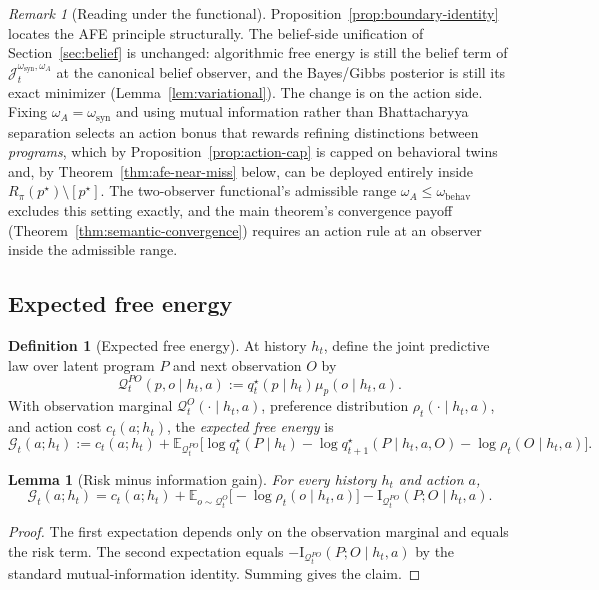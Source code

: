 \documentclass[11pt]{article}
\newtheorem{lemma}[theorem]{Lemma}
\theoremstyle{definition}
\newtheorem{definition}[theorem]{Definition}
\theoremstyle{remark}
\newtheorem{remark}[theorem]{Remark}
\newcommand{\Gcal}{\mathcal{G}}
\newcommand{\Qcal}{\mathcal{Q}}
\newcommand{\E}{\mathbb{E}}
\newcommand{\I}{\mathrm{I}}
\begin{document}
\begin{remark}[Reading under the functional]
\label{rem:boundary-identity}
Proposition~\ref{prop:boundary-identity} locates the AFE principle structurally. The belief-side unification of Section~\ref{sec:belief} is unchanged: algorithmic free energy is still the belief term of $\mathcal J_t^{\omega_{\mathrm{syn}},\omega_A}$ at the canonical belief observer, and the Bayes/Gibbs posterior is still its exact minimizer (Lemma~\ref{lem:variational}). The change is on the action side. Fixing $\omega_A=\omega_{\mathrm{syn}}$ and using mutual information rather than Bhattacharyya separation selects an action bonus that rewards refining distinctions between \emph{programs}, which by Proposition~\ref{prop:action-cap} is capped on behavioral twins and, by Theorem~\ref{thm:afe-near-miss} below, can be deployed entirely inside $R_\pi(p^\star)\setminus[p^\star]$. The two-observer functional's admissible range $\omega_A\le\omega_{\mathrm{behav}}$ excludes this setting exactly, and the main theorem's convergence payoff (Theorem~\ref{thm:semantic-convergence}) requires an action rule at an observer inside the admissible range.
\end{remark}

\subsection{Expected free energy}

\begin{definition}[Expected free energy]
\label{def:efe}
At history $h_t$, define the joint predictive law over latent program $P$ and next observation $O$ by
\[
\Qcal_t^{PO}(p,o\mid h_t,a):=q_t^\star(p\mid h_t)\mu_p(o\mid h_t,a).
\]
With observation marginal $\Qcal_t^O(\cdot\mid h_t,a)$, preference distribution $\rho_t(\cdot\mid h_t,a)$, and action cost $c_t(a;h_t)$, the \emph{expected free energy} is
\[
\Gcal_t(a;h_t)
:=
c_t(a;h_t)
+
\E_{\Qcal_t^{PO}}\!\bigl[\log q_t^\star(P\mid h_t)-\log q_{t+1}^\star(P\mid h_t,a,O)-\log\rho_t(O\mid h_t,a)\bigr].
\]
\end{definition}

\begin{lemma}[Risk minus information gain]
\label{lem:risk-ig}
For every history $h_t$ and action $a$,
\[
\Gcal_t(a;h_t)
=
c_t(a;h_t)
+\E_{o\sim\Qcal_t^O}\bigl[-\log\rho_t(o\mid h_t,a)\bigr]
-\I_{\Qcal_t^{PO}}(P;O\mid h_t,a).
\]
\end{lemma}

\begin{proof}
The first expectation depends only on the observation marginal and equals the risk term. The second expectation equals $-\I_{\Qcal_t^{PO}}(P;O\mid h_t,a)$ by the standard mutual-information identity. Summing gives the claim.
\end{proof}
\end{document}
